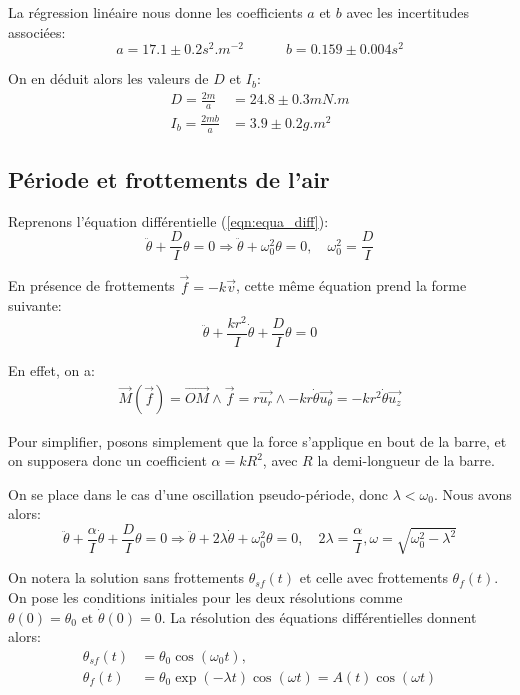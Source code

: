 \documentclass[12pt]{article}
\newcommand{\ut}{\vec{u_\theta}}
\newcommand{\ur}{\vec{u_r}}
\newcommand{\uz}{\vec{u_z}}
\begin{document}
La régression linéaire nous donne les coefficients $a$ et $b$ avec les incertitudes associées:
\begin{equation}
    a = 17.1 \pm 0.2 s^2.m^{-2} \quad \quad \quad b = 0.159 \pm 0.004 s^2
\end{equation}

On en déduit alors les valeurs de $D$ et $I_b$:
\begin{align*}
    D = \frac{2m}{a} & = 24.8 \pm 0.3 mN.m \\
    I_b = \frac{2mb}{a} & = 3.9 \pm 0.2 g.m^2
\end{align*}


\break
\subsection{Période et frottements de l'air}
\label{section:periode}
Reprenons l'équation différentielle (\ref{eqn:equa_diff}):
\begin{equation}
    \ddot \theta + \frac{D}{I}\theta = 0 \Rightarrow \ddot \theta + \omega_0^2 \theta = 0, \quad \omega_0^2 = \frac{D}{I}
    \label{eqn:sans_frottements}
\end{equation}


En présence de frottements $\vec{f} = -k \vec{v}$, cette même équation prend la forme suivante:
\begin{equation}
    \ddot \theta + \frac{k r^2}{I} \dot \theta + \frac{D}{I}\theta = 0
\end{equation}

En effet, on a:
\begin{align}
    \vec{M}(\vec{f}) = \vec{OM} \wedge \vec{f} = r\ur \wedge -k r \dot \theta \ut = -k r^2 \dot \theta \uz
\end{align}

Pour simplifier, posons simplement que la force s'applique en bout de la barre, et on supposera donc un coefficient 
$\alpha = k R^2$, avec $R$ la demi-longueur de la barre.

On se place dans le cas d'une oscillation pseudo-période, donc $\lambda < \omega_0$. Nous avons alors:
\begin{equation}
    \ddot \theta + \frac{\alpha}{I} \dot \theta + \frac{D}{I}\theta = 0 \Rightarrow \ddot \theta + 2\lambda \dot \theta + \omega_0^2\theta = 0, \quad 2\lambda = \frac{\alpha}{I}, \omega = \sqrt{\omega_0^2 - \lambda^2} 
    \label{eqn:avec_frottements}
\end{equation}

On notera la solution sans frottements $\theta_{sf}(t)$ et celle avec frottements $\theta_{f}(t)$. On pose
les conditions initiales pour les deux résolutions comme $\theta(0) = \theta_0 \text{ et } \dot \theta(0) = 0$. La résolution des équations 
différentielles donnent alors:
\begin{align}
    \theta_{sf}(t) &= \theta_0 \cos(\omega_0 t), \quad  \\
    \theta_{f}(t) &= \theta_0 \exp(-\lambda t)\cos(\omega t) = A(t) \cos(\omega t)
\end{align}
\end{document}
